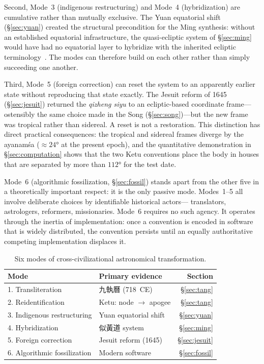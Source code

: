 \documentclass[10pt,a4paper]{article}
\newcommand{\zh}[1]{#1}
\providecommand{\degree}{\ensuremath{°}}
\begin{document}
Second, Mode~3 (indigenous restructuring) and Mode~4 (hybridization) are
cumulative rather than mutually exclusive.  The Yuan equatorial shift
(\S\ref{sec:yuan}) created the structural precondition for the Ming synthesis:
without an established equatorial infrastructure, the quasi-ecliptic system of
\S\ref{sec:ming} would have had no equatorial layer to hybridize with the
inherited ecliptic terminology~\cite{ho2003astrology}.  The modes can therefore
build on each other rather than simply succeeding one another.

Third, Mode~5 (foreign correction) can reset the system to an apparently
earlier state without reproducing that state exactly.  The Jesuit reform of
1645 (\S\ref{sec:jesuit}) returned the \textit{qizheng siyu} to an ecliptic-based
coordinate frame---ostensibly the same choice made in the Song
(\S\ref{sec:song})---but the new frame was tropical rather than sidereal.  A
reset is not a restoration.  This distinction has direct practical consequences:
the tropical and sidereal frames diverge by the ayanam\'{s}a ($\approx
24\degree$ at the present epoch), and the quantitative demonstration in
\S\ref{sec:computation} shows that the two Ketu conventions place the body in
houses that are separated by more than $112\degree$ for the test date.

Mode~6 (algorithmic fossilization, \S\ref{sec:fossil}) stands apart from the
other five in a theoretically important respect: it is the only passive mode.
Modes~1--5 all involve deliberate choices by identifiable historical actors---
translators, astrologers, reformers, missionaries.  Mode~6 requires no such
agency.  It operates through the inertia of implementation: once a convention
is encoded in software that is widely distributed, the convention persists until
an equally authoritative competing implementation displaces it.

\begin{table}[ht]
\centering
\caption{Six modes of cross-civilizational astronomical transformation.}
\label{tab:modes}
\small
\begin{tabular}{@{}llr@{}}
\toprule
Mode & Primary evidence & Section \\
\midrule
1. Transliteration & \zh{九執曆} (718~CE) & \S\ref{sec:tang} \\
2. Reidentification & Ketu: node $\to$ apogee & \S\ref{sec:tang} \\
3. Indigenous restructuring & Yuan equatorial shift & \S\ref{sec:yuan} \\
4. Hybridization & \zh{似黃道} system & \S\ref{sec:ming} \\
5. Foreign correction & Jesuit reform (1645) & \S\ref{sec:jesuit} \\
6. Algorithmic fossilization & Modern software & \S\ref{sec:fossil} \\
\bottomrule
\end{tabular}
\end{table}
\end{document}
